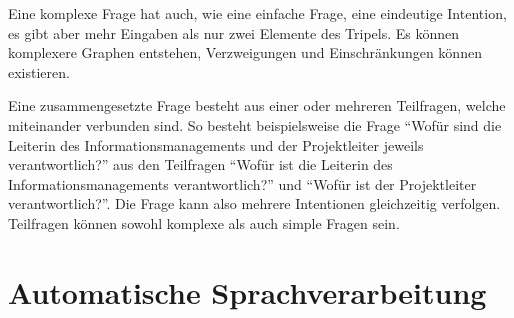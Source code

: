 \begin{definition}\label{def:kfrage}
Eine komplexe Frage hat auch, wie eine einfache Frage, eine eindeutige Intention, es gibt aber mehr Eingaben als nur zwei Elemente des Tripels.
Es können komplexere Graphen entstehen, Verzweigungen und Einschränkungen können existieren.
\end{definition}

\begin{definition}\label{def:zfrage}
Eine zusammengesetzte Frage besteht aus einer oder mehreren Teilfragen, welche miteinander verbunden sind.
So besteht beispielsweise die Frage \enquote{Wofür sind die Leiterin des Informationsmanagements und der Projektleiter jeweils verantwortlich?} aus den Teilfragen
\enquote{Wofür ist die Leiterin des Informationsmanagements verantwortlich?} und \enquote{Wofür ist der Projektleiter verantwortlich?}.
Die Frage kann also mehrere Intentionen gleichzeitig verfolgen.
Teilfragen können sowohl komplexe als auch simple Fragen sein.
\end{definition}

\section{Automatische Sprachverarbeitung}

